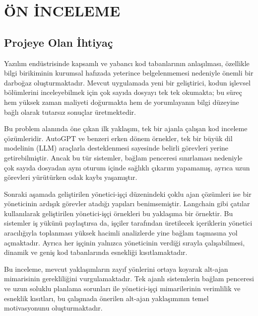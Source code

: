 
\chapter{ÖN İNCELEME}
\label{ch:on-inceleme}


\section{Projeye Olan İhtiyaç}
\label{sec:ihtiyac}

Yazılım endüstrisinde kapsamlı ve yabancı kod tabanlarının anlaşılması, özellikle bilgi birikiminin kurumsal hafızada yeterince belgelenmemesi nedeniyle önemli bir darboğaz oluşturmaktadır. Mevcut uygulamada yeni bir geliştirici, kodun işlevsel bölümlerini inceleyebilmek için çok sayıda dosyayı tek tek okumakta; bu süreç hem yüksek zaman maliyeti doğurmakta hem de yorumlayanın bilgi düzeyine bağlı olarak tutarsız sonuçlar üretmektedir. 

Bu problem alanında öne çıkan ilk yaklaşım, tek bir ajanla çalışan kod inceleme çözümleridir. AutoGPT ve benzeri erken dönem örnekler, tek bir büyük dil modelinin (LLM) araçlarla desteklenmesi sayesinde belirli görevleri yerine getirebilmiştir. Ancak bu tür sistemler, bağlam penceresi sınırlaması nedeniyle çok sayıda dosyadan aynı oturum içinde sağlıklı çıkarım yapamamış, ayrıca uzun görevleri yürütürken odak kaybı yaşamıştır. 

Sonraki aşamada geliştirilen yönetici-işçi düzenindeki çoklu ajan çözümleri ise bir yöneticinin ardışık görevler atadığı yapıları benimsemiştir. Langchain gibi çatılar kullanılarak geliştirilen yönetici-işçi örnekleri bu yaklaşıma bir örnektir. Bu sistemler iş yükünü paylaştırsa da, işçiler tarafından üretilecek içeriklerin yönetici aracılığıyla toplanması yüksek hacimli analizlerde yine bağlam taşmasına yol açmaktadır. Ayrıca her işçinin yalnızca yöneticinin verdiği sırayla çalışabilmesi, dinamik ve geniş kod tabanlarında esnekliği kısıtlamaktadır. 

Bu inceleme, mevcut yaklaşımların zayıf yönlerini ortaya koyarak alt-ajan mimarisinin gerekliliğini vurgulamaktadır. Tek ajanlı sistemlerin bağlam penceresi ve uzun soluklu planlama sorunları ile yönetici-işçi mimarilerinin verimlilik ve esneklik kısıtları, bu çalışmada önerilen alt-ajan yaklaşımının temel motivasyonunu oluşturmaktadır.

